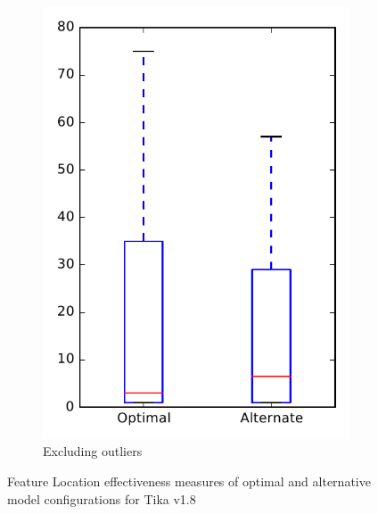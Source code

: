 \begin{figure}
\begin{subfigure}{.4\textwidth}
        \includegraphics[height=0.4\textheight]{figures/combo/flt_rq1_tika_no_outlier}
        \caption{Excluding outliers}\label{fig:combo:flt:rq1:tika_no_outlier}
    \end{subfigure}
\caption{Feature Location effectiveness measures of optimal and alternative model configurations for Tika v1.8}
\label{fig:combo:flt:rq1:tika}
\end{figure}
